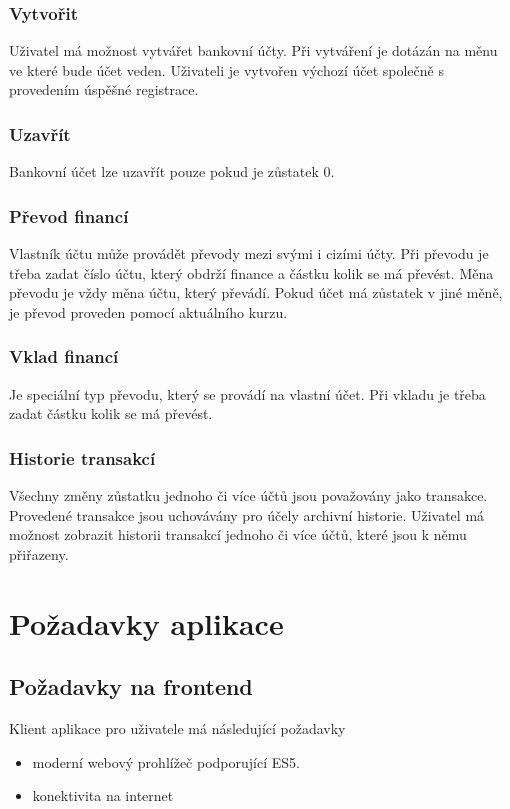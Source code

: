 \documentclass[FM,SP]{tulthesis}
\begin{document}
\subsubsection{Vytvořit}
Uživatel má možnost vytvářet bankovní účty. Při vytváření je dotázán na měnu ve které bude účet veden. Uživateli je vytvořen výchozí účet společně s provedením úspěšné registrace.

\subsubsection{Uzavřít}
Bankovní účet lze uzavřít pouze pokud je zůstatek 0.

\subsubsection{Převod financí}
Vlastník účtu může provádět převody mezi svými i cizími účty. Při převodu je třeba zadat číslo účtu, který obdrží finance a částku kolik se má převést. Měna převodu je vždy měna účtu, který převádí. Pokud účet má zůstatek v jiné měně, je převod proveden pomocí aktuálního kurzu.

\subsubsection{Vklad financí}
Je speciální typ převodu, který se provádí na vlastní účet. Při vkladu je třeba zadat částku kolik se má převést.

\subsubsection{Historie transakcí}
Všechny změny zůstatku jednoho či více účtů jsou považovány jako transakce. Provedené transakce jsou uchovávány pro účely archivní historie. Uživatel má možnost zobrazit historii transakcí jednoho či více účtů, které jsou k němu přiřazeny.

\section{Požadavky aplikace}



\subsection{Požadavky na frontend}
Klient aplikace pro uživatele má následující požadavky
\begin{itemize}
    \item moderní webový prohlížeč podporující ES5.
    \item konektivita na internet
\end{itemize}
\end{document}
